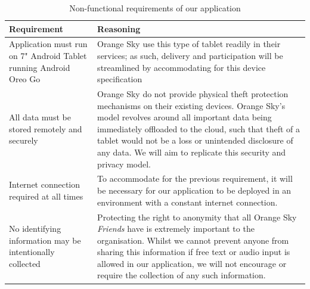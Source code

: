 \begin{table}[h]
    \centering
    \begin{tabularx}{\textwidth}{ >{\hsize}Y | >{\hsize}Y }
        \hline
        Requirement                                                       & Reasoning                                                                                                                                                                                                                                                                                                                                 \\ [0.5ex]
        \hline
        Application must run on 7" Android Tablet running Android Oreo Go & Orange Sky use this type of tablet readily in their services; as such, delivery and participation will be streamlined by accommodating for this device specification                                                                                                                                                                      \\
        All data must be stored remotely and securely                     & Orange Sky do not provide physical theft protection mechanisms on their existing devices. Orange Sky's model revolves around all important data being immediately offloaded to the cloud, such that theft of a tablet would not be a loss or unintended disclosure of any data. We will aim to replicate this security and privacy model. \\
        Internet connection required at all times                         & To accommodate for the previous requirement, it will be necessary for our application to be deployed in an environment with a constant internet connection.                                                                                                                                                                               \\
        No identifying information may be intentionally collected         & Protecting the right to anonymity that all Orange Sky \emph{Friends} have is extremely important to the organisation. Whilst we cannot prevent anyone from sharing this information if free text or audio input is allowed in our application, we will not encourage or require the collection of any such information.                   \\
        \hline
    \end{tabularx}
    \caption{Non-functional requirements of our application}
    \label{nonfunctionalreqs}
\end{table}

